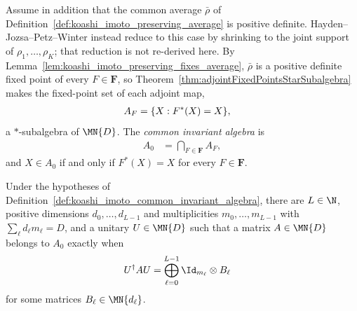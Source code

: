 \begin{definition}
    \label{def:koashi_imoto_common_invariant_algebra}
    \leanok
    Assume in addition that the common average $\bar\rho$ of
    Definition~\ref{def:koashi_imoto_preserving_average} is positive
    definite. Hayden--Jozsa--Petz--Winter instead reduce to this case by
    shrinking to the joint support of $\rho_1,\ldots,\rho_K$; that reduction
    is not re-derived here. By
    Lemma~\ref{lem:koashi_imoto_preserving_fixes_average}, $\bar\rho$ is a
    positive definite fixed point of every $F\in\mathbf F$, so
    Theorem~\ref{thm:adjointFixedPointsStarSubalgebra} makes the fixed-point
    set of each adjoint map,
    \begin{align}
        A_F
        &=\{X:F^*(X)=X\},
        \notag
    \end{align}
    a $*$-subalgebra of $\MN{D}$. The \emph{common invariant algebra} is
    \begin{align}
        A_0
        &=\bigcap_{F\in\mathbf F}A_F,
        \label{eq:koashi_imoto_common_invariant_algebra}
    \end{align}
    and $X\in A_0$ if and only if $F^*(X)=X$ for every $F\in\mathbf F$.
\end{definition}

\begin{theorem}
    \label{thm:koashi_imoto_common_invariant_algebra_block_form}
    \leanok
    Under the hypotheses of
    Definition~\ref{def:koashi_imoto_common_invariant_algebra}, there are
    $L\in\N$, positive dimensions $d_0,\ldots,d_{L-1}$ and multiplicities
    $m_0,\ldots,m_{L-1}$ with $\sum_\ell d_\ell m_\ell=D$, and a unitary
    $U\in\MN{D}$ such that a matrix $A\in\MN{D}$ belongs to $A_0$ exactly
    when
    \begin{align}
        U^\dagger A U
        &=\bigoplus_{\ell=0}^{L-1}\Id_{m_\ell}\otimes B_\ell
        \notag
    \end{align}
    for some matrices $B_\ell\in\MN{d_\ell}$.
\end{theorem}


